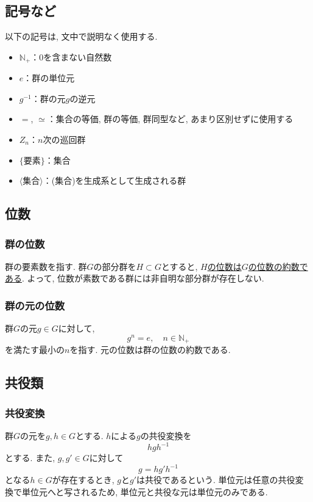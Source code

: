 \documentclass[11pt, a4paper]{jsarticle}
\begin{document}
\subsection{記号など}
以下の記号は, 文中で説明なく使用する.
\begin{itemize}
\item $\mathbb{N}_+$：0を含まない自然数
\item $e$：群の単位元
\item $g^{-1}$：群の元$g$の逆元
\item $=$, $\simeq$：集合の等価, 群の等価, 群同型など, あまり区別せずに使用する
\item $Z_n$：$n$次の巡回群
\item $\{\text{要素}\}$：集合
\item $\langle\text{集合}\rangle$：(集合)を生成系として生成される群
\end{itemize}

\subsection{位数}
\subsubsection{群の位数}
群の要素数を指す.
群$G$の部分群を$H \subset G$とすると, \uline{$H$の位数は$G$の位数の約数である}.
よって, 位数が素数である群には非自明な部分群が存在しない.

\subsubsection{群の元の位数}
群$G$の元$g\in G$に対して,
\begin{equation}
	g^n = e,\quad n\in\mathbb{N}_+
\end{equation}
を満たす最小の$n$を指す.
元の位数は群の位数の約数である.

\subsection{共役類}
\subsubsection{共役変換}
群$G$の元を$g,h\in G$とする.
$h$による$g$の共役変換を
\begin{equation}
 h g h^{-1}
\end{equation}
とする.
また, $g,g'\in G$に対して
\begin{equation}
 g = h g' h^{-1}
\end{equation}
となる$h\in G$が存在するとき, $g$と$g'$は共役であるという. 
単位元は任意の共役変換で単位元へと写されるため, 単位元と共役な元は単位元のみである.
\end{document}
